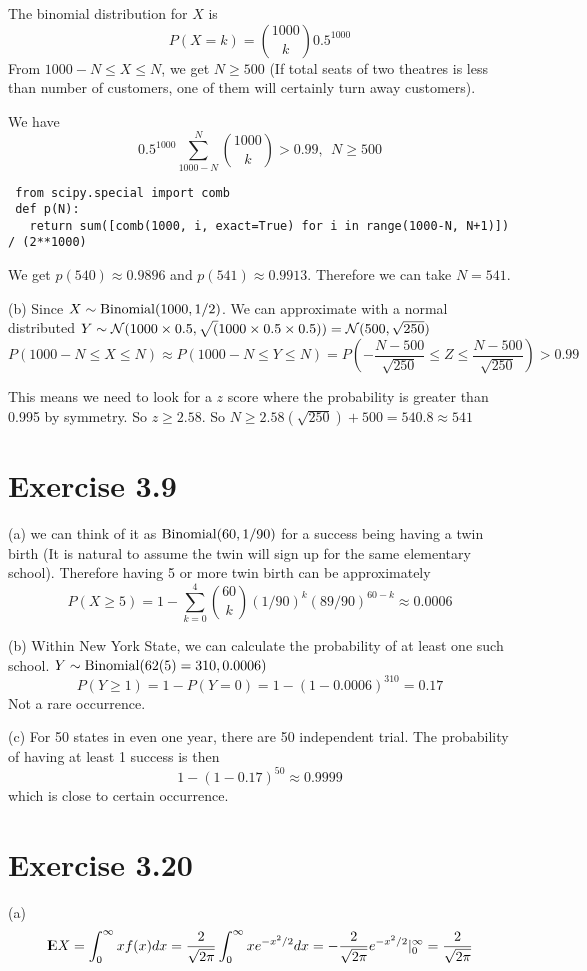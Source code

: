 \documentclass[12pt]{article}
\begin{document}
The binomial distribution for $X$ is $$ P(X = k) = {1000 \choose k} 0.5^{1000}$$
From $1000 -N \leq X \leq N$, we get $N \geq 500$ (If total seats of two theatres is less than number of customers, one of them will certainly turn away customers).

We have
$$ 0.5^{1000} \sum^{N}_{1000-N} {1000 \choose k} > 0.99, \ \ N \geq 500$$
\begin{lstlisting}
 from scipy.special import comb
 def p(N):
   return sum([comb(1000, i, exact=True) for i in range(1000-N, N+1)]) / (2**1000)
\end{lstlisting}
We get $p(540) \approx 0.9896$ and $p(541) \approx 0.9913$. Therefore we can take $N = 541$.

(b) Since $X \sim \mathrm{Binomial} (1000, 1/2)$. We can approximate with a normal distributed $Y \sim \mathcal{N} (1000 \times 0.5, \sqrt(1000 \times 0.5 \times 0.5)) = \mathcal{N} (500, \sqrt{250})$
$$ P(1000- N \leq X \leq N) \approx P( 1000 - N \leq Y \leq N) = P(- \frac{N - 500}{\sqrt{250}} \leq Z \leq \frac{N - 500}{\sqrt{250}}) > 0.99$$

This means we need to look for a $z$ score where the probability is greater than 0.995 by symmetry. So $z \geq 2.58$. So $N \geq 2.58 (\sqrt{250}) + 500 = 540.8 \approx 541$

\section*{Exercise 3.9}
(a) we can think of it as $\mathrm{Binomial} (60, 1/90)$ for a success being having a twin birth (It is natural to assume the twin will sign up for the same elementary school). Therefore having 5 or more twin birth can be approximately
$$ P(X \geq 5) = 1 - \sum^{4}_{k=0}{60 \choose k} (1/90)^k (89/90)^{60-k} \approx 0.0006 $$

(b) Within New York State, we can calculate the probability of at least one such school. $Y \sim \mathrm{Binomial} (62(5)=310, 0.0006)$
$$ P(Y \geq 1) = 1- P(Y=0) = 1 - (1-0.0006)^{310} = 0.17$$
Not a rare occurrence.

(c) For 50 states in even one year, there are 50 independent trial. The probability of having at least 1 success is then $$ 1 - (1 - 0.17)^{50} \approx 0.9999$$ 
which is close to certain occurrence.

\section*{Exercise 3.20}
(a) $$ {\rm I\kern-.3em E} X = \int^{\infty}_{0} xf(x) dx = \frac{2}{\sqrt{2\pi}} \int^{\infty}_{0} x e^{-x^2/2} dx
 = - \frac{2}{\sqrt{2\pi}} e^{-x^2/2} |^{\infty}_{0} =  \frac{2}{\sqrt{2\pi}}$$
 
\end{document}
